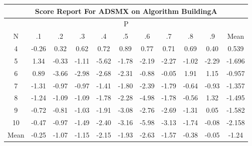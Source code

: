 \documentclass[11pt,a4paper]{report}
\begin{document}
\begin{longtable}{ | c || c | c | c | c | c | c | c | c | c || c |}
\hline
\multicolumn{11}{|c|}{ Score Report For ADSMX on Algorithm BuildingA} \\
\hline
\multicolumn{11}{|c|}{ P } \\
\hline
N & .1 & .2 & .3 & .4 & .5 & .6 & .7 & .8 & .9 & Mean\\
 \hline
 \hline
 \endhead
  4 &  \cellcolor[HTML]{FFF7F7} -0.26 &  \cellcolor[HTML]{F7F7FF} 0.32 &  \cellcolor[HTML]{EFEFFF} 0.62 &  \cellcolor[HTML]{EFEFFF} 0.72 &  \cellcolor[HTML]{E7E7FF} 0.89 &  \cellcolor[HTML]{EFEFFF} 0.77 &  \cellcolor[HTML]{EFEFFF} 0.71 &  \cellcolor[HTML]{EFEFFF} 0.69 &  \cellcolor[HTML]{F7F7FF} 0.40 & 0.539 \\
  5 &  \cellcolor[HTML]{DFDFFF} 1.34 &  \cellcolor[HTML]{FFF7F7} -0.33 &  \cellcolor[HTML]{FFDFDF} -1.11 &  \cellcolor[HTML]{FF7070} -5.62 &  \cellcolor[HTML]{FFCFCF} -1.78 &  \cellcolor[HTML]{FFC7C7} -2.19 &  \cellcolor[HTML]{FFC7C7} -2.27 &  \cellcolor[HTML]{FFE7E7} -1.02 &  \cellcolor[HTML]{FFC7C7} -2.29 & -1.696 \\
  6 &  \cellcolor[HTML]{E7E7FF} 0.89 &  \cellcolor[HTML]{FF9F9F} -3.66 &  \cellcolor[HTML]{FFB7B7} -2.98 &  \cellcolor[HTML]{FFBFBF} -2.68 &  \cellcolor[HTML]{FFC7C7} -2.31 &  \cellcolor[HTML]{FFE7E7} -0.88 &  \cellcolor[HTML]{FFFFFF} -0.05 &  \cellcolor[HTML]{CFCFFF} 1.91 &  \cellcolor[HTML]{DFDFFF} 1.15 & -0.957 \\
  7 &  \cellcolor[HTML]{FFDFDF} -1.31 &  \cellcolor[HTML]{FFE7E7} -0.97 &  \cellcolor[HTML]{FFE7E7} -0.97 &  \cellcolor[HTML]{FFDFDF} -1.41 &  \cellcolor[HTML]{FFCFCF} -1.80 &  \cellcolor[HTML]{FFBFBF} -2.39 &  \cellcolor[HTML]{FFCFCF} -1.79 &  \cellcolor[HTML]{FFEFEF} -0.64 &  \cellcolor[HTML]{FFE7E7} -0.93 & -1.357 \\
  8 &  \cellcolor[HTML]{FFDFDF} -1.24 &  \cellcolor[HTML]{FFE7E7} -1.09 &  \cellcolor[HTML]{FFE7E7} -1.09 &  \cellcolor[HTML]{FFCFCF} -1.78 &  \cellcolor[HTML]{FFC7C7} -2.28 &  \cellcolor[HTML]{FF8080} -4.98 &  \cellcolor[HTML]{FFCFCF} -1.78 &  \cellcolor[HTML]{FFEFEF} -0.56 &  \cellcolor[HTML]{DFDFFF} 1.32 & -1.495 \\
  9 &  \cellcolor[HTML]{FFEFEF} -0.72 &  \cellcolor[HTML]{FFE7E7} -0.81 &  \cellcolor[HTML]{FFE7E7} -1.03 &  \cellcolor[HTML]{FFCFCF} -1.91 &  \cellcolor[HTML]{FFAFAF} -3.08 &  \cellcolor[HTML]{FFB7B7} -2.76 &  \cellcolor[HTML]{FFBFBF} -2.69 &  \cellcolor[HTML]{FFDFDF} -1.31 &  \cellcolor[HTML]{FFFFFF} 0.05 & -1.582 \\
  10 &  \cellcolor[HTML]{FFF7F7} -0.47 &  \cellcolor[HTML]{FFE7E7} -0.97 &  \cellcolor[HTML]{FFD7D7} -1.49 &  \cellcolor[HTML]{FFBFBF} -2.40 &  \cellcolor[HTML]{FFAFAF} -3.16 &  \cellcolor[HTML]{FF6868} -5.98 &  \cellcolor[HTML]{FFAFAF} -3.13 &  \cellcolor[HTML]{FFD7D7} -1.74 &  \cellcolor[HTML]{FFFFFF} -0.08 & -2.158 \\
 \hline
 \hline
Mean &  \cellcolor[HTML]{FFF7F7} -0.25 &  \cellcolor[HTML]{FFE7E7} -1.07 &  \cellcolor[HTML]{FFDFDF} -1.15 &  \cellcolor[HTML]{FFC7C7} -2.15 &  \cellcolor[HTML]{FFCFCF} -1.93 &  \cellcolor[HTML]{FFBFBF} -2.63 &  \cellcolor[HTML]{FFD7D7} -1.57 &  \cellcolor[HTML]{FFF7F7} -0.38 &  \cellcolor[HTML]{FFFFFF} -0.05 &  \cellcolor[HTML]{FFDFDF} -1.24
\end{longtable}
\end{document}
